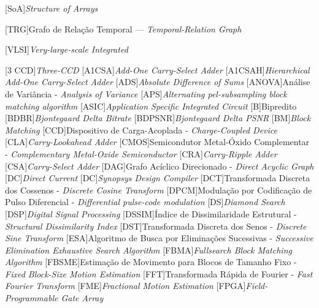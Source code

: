 \begin{acronym}
[SoA]{\textit{Structure of Arrays}}

[TRG]{Grafo de Relação Temporal --- \textit{Temporal-Relation Graph}}

[VLSI]{\textit{Very-large-scale Integrated}}




[3 CCD]{\textit{Three-CCD}}
[A1CSA]{\textit{Add-One Carry-Select Adder}}
[A1CSAH]{\textit{Hierarchical Add-One Carry-Select Adder}}
[ADS]{\textit{Absolute Difference of Sums}}
[ANOVA]{Análise de Variância - \textit{Analysis of Variance}}
[APS]{\textit{Alternating pel-subsampling block matching algorithm}}
[ASIC]{\textit{Application Specific Integrated Circuit}}
[B]{Bipredito}
[BDBR]{\textit{Bjontegaard Delta Bitrate}}
[BDPSNR]{\textit{Bjontegaard Delta PSNR}}
[BM]{\textit{Block Matching}}
[CCD]{Dispositivo de Carga-Acoplada - \textit{Charge-Coupled Device}}
[CLA]{\textit{Carry-Lookahead Adder}}
[CMOS]{Semicondutor Metal-Óxido Complementar - \textit{Complementary Metal-Oxide Semiconductor}}
[CRA]{\textit{Carry-Ripple Adder}}
[CSA]{\textit{Carry-Select Adder}}
[DAG]{Grafo Acíclico Direcionado - \textit{Direct Acyclic Graph}}
[DC]{\textit{Direct Current}}
[DC]{\textit{Synopsys Design Compiler}}
[DCT]{Transformada Discreta dos Cossenos - \textit{Discrete Cosine Transform}}
[DPCM]{Modulação por Codificação de Pulso Diferencial - \textit{Differential pulse-code modulation}}
[DS]{\textit{Diamond Search}}
[DSP]{\textit{Digital Signal Processing}}
[DSSIM]{Índice de Dissimilaridade Estrutural - \textit{Structural Dissimilarity Index}}
[DST]{Transformada Discreta dos Senos - \textit{Discrete Sine Transform}}
[ESA]{Algoritmo de Busca por Eliminações Sucessivas - \textit {Successive Elimination Exhaustive Search Algorithm}}
[FBMA]{\textit{Fullsearch Block Matching Algorithm}}
[FBSME]{Estimação de Movimento para Blocos de Tamanho Fixo - \textit{Fixed Block-Size Motion Estimation}}
[FFT]{Transformada Rápida de Fourier - \textit{Fast Fourier Transform}}
[FME]{\textit{Fractional Motion Estimation}}
[FPGA]{\textit{Field-Programmable Gate Array}}

\end{acronym}
